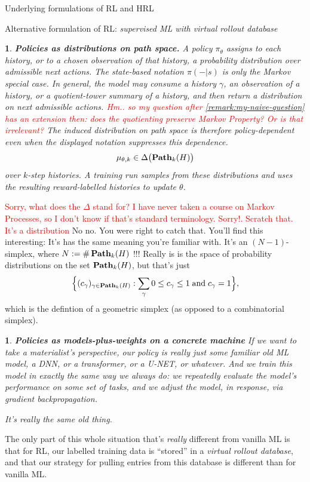 \documentclass[11pt]{article}
\newtheorem{ermark}[subsubsection]{}
\begin{document}
\begin{section}{Underlying formulations of RL and HRL}
\begin{subsection}{Alternative formulation of RL: {\em supervised ML with virtual rollout database}}
\begin{ermark}
{\bf Policies as distributions on path space.}
\normalfont
A policy $\pi_\theta$ assigns to each history, or to a chosen observation of that history, a probability distribution over admissible next actions. The state-based notation $\pi(-|s)$ is only the Markov special case. In general, the model may consume a history $\gamma$, an observation of a history, or a quotient-tower summary of a history, and then return a distribution on next admissible actions. \textcolor{red}{Hm.. so my question after \ref{remark:my-naive-question} has an extension then: does the quotienting preserve Markov Property? Or is that irrelevant?} The induced distribution on path space is therefore policy-dependent even when the displayed notation suppresses this dependence.
\[
    \mu_{\theta,k}\in \Delta\big(\bold{Path}_k(H)\big)
\]
over $k$-step histories.  A training run samples from these distributions and uses the resulting reward-labelled histories to update $\theta$.
\end{ermark}
\textcolor{red}{Sorry, what does the $\Delta$ stand for? I have never taken a course on Markov Processes, so I don't know if that's standard terminology. Sorry!. Scratch that. It's a distribution} {\color{blue} No no. You were right to catch that. You'll find this interesting: It's has the same meaning you're familiar with. It's an $(N-1)$-simplex, where $N:=\#\,\bold{Path}_{k}(H)$ !!! Really is is the space of probability distributions on the set $\bold{Path}_{k}(H)$, but that's just
$$
\Big\{(c_{\gamma})_{\gamma\in\bold{Path}_{k}(H)}:\sum_{\gamma}0\le c_{\gamma}\le 1\;\text{and}\;c_{\gamma}=1\Big\},
$$
which is the defintion of a geometric simplex (as opposed to a combinatorial simplex).}
\begin{ermark}
{\bf Policies as models-plus-weights on a concrete machine}
\normalfont
If we want to take a materialist's perspective, our policy is {\em really} just some familiar old ML model, a DNN, or a transformer, or a U-NET, or whatever.  And we train this model in exactly the same way we always do: we repeatedly evaluate the model’s performance on some set of tasks, and we adjust the model, in response, via gradient backpropagation.

It’s really the same old thing. 
\end{ermark}

The only part of this whole situation that’s {\em really} different from vanilla ML is that for RL, our labelled training data is ``stored'' in a {\em virtual rollout database}, and that our strategy for pulling entries from this database is different than for vanilla ML.


\end{subsection}
\end{section}
\end{document}
